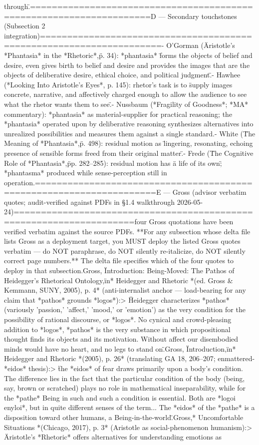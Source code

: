 {through.\"\n\n====================================================================\nSOURCE D — Secondary touchstones (Subsection 2 integration)\n====================================================================\n\n- O'Gorman (\"Aristotle's *Phantasia* in the *Rhetoric*,\" p. 34): *phantasia* \"forms the objects of belief and desire, even gives birth to belief and desire and provides the images that are the objects of deliberative desire, ethical choice, and political judgment.\"\n- Hawhee (*Looking Into Aristotle's Eyes*, p. 145): rhetor's task is to \"supply images concrete, narrative, and affectively charged enough to allow the audience to see what the rhetor wants them to see.\"\n- Nussbaum (*Fragility of Goodness*; *MA* commentary): *phantasia* as material-supplier for practical reasoning; the *phantasia* operated upon by deliberative reasoning synthesizes alternatives into unrealized possibilities and measures them against a single standard.\n- White (\"The Meaning of *Phantasia*,\" p. 498): residual motion as \"lingering, resonating, echoing presence of sensible forms freed from their original matter.\"\n- Frede (\"The Cognitive Role of *Phantasia*,\" pp. 282–285): residual motion has \"a life of its own\"; *phantasma* produced while sense-perception still in operation.\n\n====================================================================\nSOURCE E — Gross (advisor verbatim quotes; audit-verified against PDFs in §1.4 walkthrough 2026-05-24)\n====================================================================\n\nThese four Gross quotations have been verified verbatim against the source PDFs. **For any subsection whose delta file lists Gross as a deployment target, you MUST deploy the listed Gross quotes verbatim — do NOT paraphrase, do NOT silently re-italicize, do NOT silently correct page numbers.** The delta file specifies which of the four quotes to deploy in that subsection.\n\n*Gross, \"Introduction: Being-Moved: The Pathos of Heidegger's Rhetorical Ontology,\" in* Heidegger and Rhetoric *(ed. Gross & Kemmann, SUNY, 2005), p. 4* (anti-internalist anchor — load-bearing for any claim that *pathos* grounds *logos*):\n> \"Heidegger characterizes *pathos* (variously 'passion,' 'affect,' 'mood,' or 'emotion') as the very condition for the possibility of rational discourse, or *logos*. No cynical and crowd-pleasing addition to *logos*, *pathos* is the very substance in which propositional thought finds its objects and its motivation. Without affect our disembodied minds would have no heart, and no legs to stand on.\"\n\n*Gross, \"Introduction,\" in* Heidegger and Rhetoric *(2005), p. 26* (translating GA 18, 206–207; enmattered-*eidos* thesis):\n> \"the *eidos* of fear draws primarily upon a body's condition. The difference lies in the fact that the particular condition of the body (being, say, brown or scratched) plays no role in mathematical inseparability, while for the *pathe* Being in such and such a condition is essential. Both are *logoi enyloi*, but in quite different senses of the term... The *eidos* of the *pathe* is a disposition toward other humans, a Being-in-the-world.\"\n\n*Gross,* Uncomfortable Situations *(Chicago, 2017), p. 3* (Aristotle as social-phenomenon humanism):\n> \"Aristotle's *Rhetoric* offers alternatives for understanding emotions as }

